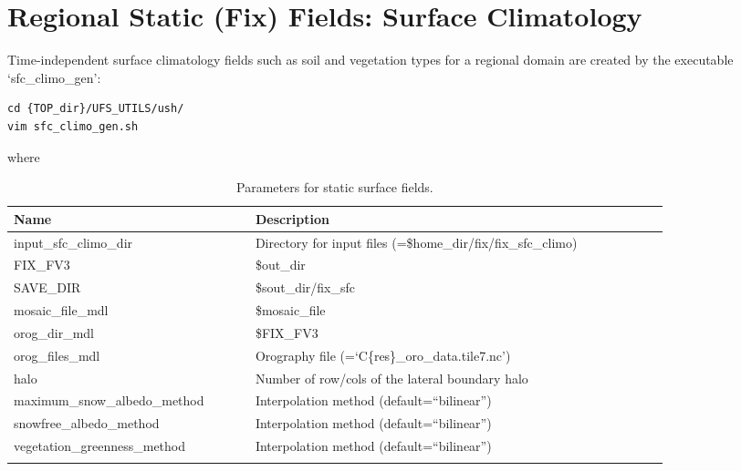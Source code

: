 \documentclass[11pt,fleqn]{report}              %
\begin{document}
\section{Regional Static (Fix) Fields: Surface Climatology}
\label{sec:sar_pre_fix}

Time-independent surface climatology fields such as soil and vegetation types for a regional domain are created by the executable `sfc\_climo\_gen':

\lstset{language=bash}   
\begin{lstlisting}[frame=trBL]
cd {TOP_dir}/UFS_UTILS/ush/
vim sfc_climo_gen.sh
\end{lstlisting}
where
{
\fontsize{10}{12}\selectfont
\begin{longtable}{ p{0.31\linewidth} | p{0.53\linewidth} }
\hline
\hline
 Name & Description \\
\hline
 input\_sfc\_climo\_dir & Directory for input files (=\$home\_dir/fix/fix\_sfc\_climo) \\
 FIX\_FV3 & \$out\_dir \\
 SAVE\_DIR & \$sout\_dir/fix\_sfc \\
 mosaic\_file\_mdl & \$mosaic\_file \\
 orog\_dir\_mdl & \$FIX\_FV3 \\
 orog\_files\_mdl & Orography file (=`C\{res\}\_oro\_data.tile7.nc') \\
 halo & Number of row/cols of the lateral boundary halo \\
 maximum\_snow\_albedo\_method & Interpolation method (default=``bilinear'') \\
 snowfree\_albedo\_method & Interpolation method (default=``bilinear'') \\
 vegetation\_greenness\_method & Interpolation method (default=``bilinear'') \\
\hline
\caption{Parameters for static surface fields.}
\label{table:var_surf_fix}
\end{longtable}
}
\end{document}
